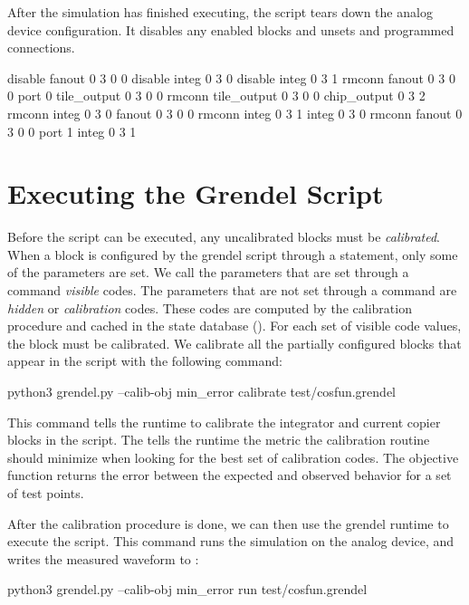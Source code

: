 After the simulation has finished executing, the \grendel script tears down the
analog device configuration. It disables any enabled blocks and unsets and
programmed connections.

\begin{snippet}
disable fanout 0 3 0 0
disable integ 0 3 0
disable integ 0 3 1
rmconn fanout 0 3 0 0 port 0 tile_output 0 3 0 0
rmconn tile_output 0 3 0 0 chip_output 0 3 2
rmconn integ 0 3 0 fanout 0 3 0 0
rmconn integ 0 3 1 integ 0 3 0
rmconn fanout 0 3 0 0 port 1 integ 0 3 1
\end{snippet}

\section{Executing the Grendel Script}

Before the  script can be executed, any uncalibrated blocks
must be \textit{calibrated}. When a block is configured by the grendel script
through a  statement, only some of the parameters are set. We call the
parameters that are set through a \grendel command \textit{visible} codes. The
parameters that are not set through a \grendel command are \textit{hidden}
or \textit{calibration} codes. These codes are computed by the calibration
procedure and cached in the state database (). For each set of
visible code values, the block must be calibrated. We calibrate all the
partially configured blocks that appear in the  script with the
following command:


\begin{snippet}
python3 grendel.py --calib-obj min_error calibrate test/cosfun.grendel
\end{snippet}

This command tells the \grendel runtime to calibrate the integrator and current
copier blocks in the script. The  tells the \grendel runtime the
metric the calibration routine should minimize when looking for the best set of
calibration codes. The  objective function returns the error
between the expected and observed behavior for a set of test points.

After the calibration procedure is done, we can then use the grendel runtime to
execute the script. This command runs the simulation on the analog device, and
writes the measured waveform to :

\begin{snippet}
python3 grendel.py --calib-obj min_error run test/cosfun.grendel
\end{snippet}

